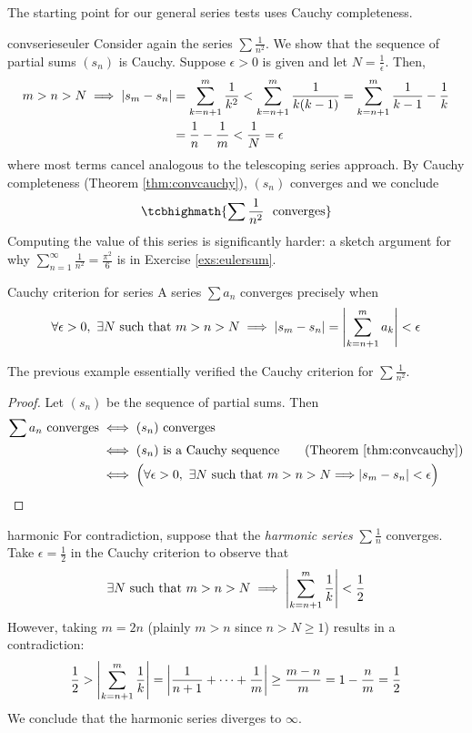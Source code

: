 \goodbreak



The starting point for our general series tests uses Cauchy completeness.

\begin{example}{}{convserieseuler}
	Consider again the series $\sum\frac 1{n^2}$. We show that the sequence of partial sums $(s_n)$ is Cauchy. Suppose $\epsilon>0$ is given and let $N=\frac 1\epsilon$. Then,
	\begin{align*}
		m>n>N\implies \left| s_m-s_n\right|
		&=\sum_{k=n+1}^m\frac 1{k^2}<\sum_{k=n+1}^m\frac 1{k(k-1)} 
		=\sum_{k=n+1}^m\frac 1{k-1}-\frac 1k\\
		&=\frac 1n-\frac 1m<\frac 1N =\epsilon
	\end{align*}
	where most terms cancel analogous to the telescoping series approach. By Cauchy completeness (Theorem \ref{thm:convcauchy}), $(s_n)$ converges and we conclude
	\[
		\tcbhighmath{\sum\frac 1{n^2}\ \text{ converges}}
	\]
	Computing the value of this series is significantly harder: a sketch argument for why $\sum_{n=1}^\infty\frac 1{n^2}=\frac{\pi^2}6$ is in Exercise \ref{exs:eulersum}.
\end{example}

\begin{thm}{Cauchy criterion for series}{}
	A series $\sum a_n$ converges precisely when
	\[
		\forall\epsilon>0,\ \exists N\text{ such that }m> n>N
		\implies\left| s_m-s_{n}\right|=\left| \sum_{k=n+1}^ma_k\right|<\epsilon
	\]
\end{thm}

The previous example essentially verified the Cauchy criterion for $\sum\frac 1{n^2}$.

\begin{proof}
	Let $(s_n)$ be the sequence of partial sums. Then
	\begin{align*}
		\sum a_n\text{ converges}
		&\iff (s_n)\text{ converges}\\
		&\iff (s_n)\text{ is a Cauchy sequence} 
		\tag{Theorem \ref{thm:convcauchy}}\\
		&\iff \Bigl(\forall\epsilon>0,\ \exists N\text{ such that }m> n>N
		\Longrightarrow\nm{s_m-s_n}<\epsilon\Bigr)
		\tag*{\qedhere}
	\end{align*}
\end{proof}

\begin{example}{}{harmonic}
	For contradiction, suppose that the \emph{harmonic series} $\sum\frac 1n$ converges. Take $\epsilon=\frac 12$ in the Cauchy criterion to observe that
	\[
		\exists N\text{ such that }m> n>N\implies \left| \sum_{k=n+1}^{m}\frac 1k\right|<\frac 12
	\]
	However, taking $m=2n$ (plainly $m>n$ since $n>N\ge 1$) results in a contradiction: 
	\[
		\frac 12>\left| \sum_{k=n+1}^{m}\frac 1k\right|=\left| \frac 1{n+1}+\cdots+\frac 1m\right|\ge \frac{m-n}{m}=1-\frac nm=\frac 12
	\]
	We conclude that the harmonic series diverges to $\infty$.
\end{example}

